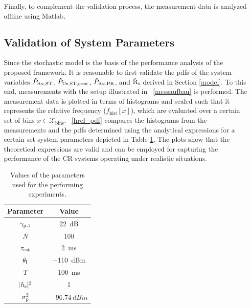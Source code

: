 Finally, to complement the validation process, the measurement data is analyzed offline using Matlab.

\subsection{Validation of System Parameters}
\label{ssec:val_sys}
Since the stochastic model is the basis of the performance analysis of the proposed framework. It is reasonable to first validate the pdfs of the system variables $\hat{P}_{\text{Rx,ST}}$, $\hat{P}_{\text{Tx,ST,cont}}$, $\hat{P}_{\text{Rx,PR}}$, and $\hat{\text{{R}}}_{\text{s}}$ derived in Section \ref{model}. To this end, measurements with the setup illustrated in \figurename~\ref{messaufbau} is performed. The measurement data is plotted in terms of histograms and scaled such that it represents the relative frequency ($f_\textrm{hist}[x]$), which are evaluated over a certain set of bins $x \in \mathcal X_\text{bins}$. \figurename~\ref{hrel_pdf} compares the histograms from the measurements and the pdfs determined using the analytical expressions for a certain set system parameters depicted in Table \ref{param}. The plots show that the theoretical expressions are valid and can be employed for capturing the performance of the CR systems operating under realistic situations. 


\begin{table}
	\renewcommand{\arraystretch}{1.4}
	\centering
	\caption{Values of the parameters used for the performing experiments.}
	\label{param}
	\begin{tabular}{c||c}
		\bfseries Parameter & \bfseries Value \\ \hline \hline
		${\gamma}_{\text{p,1}}$ & \SI{22}{dB} \\
		$N$ & 100 \\
		$\tau_{\text{est}}$ & \SI{2}{ms}\\
		$\theta_{\text{I}}$ & \SI{-110}{dBm}\\
		$T$ & \SI{100}{ms}\\
		$|h_{\text{s}}|^2$ & 1 \\
		$\sigma^2_{\text{p}}$ & $\SI{-96.74}{dBm}$\\ \hline
	\end{tabular}
\end{table}

